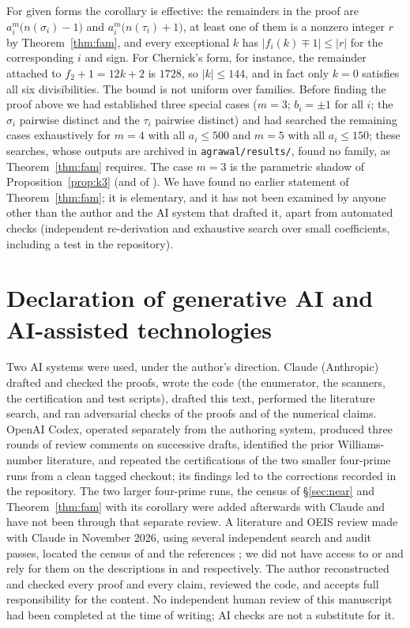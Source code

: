 \documentclass[11pt]{amsart}
\theoremstyle{definition}
\theoremstyle{remark}
\begin{document}
For given forms the corollary is effective: the remainders in the proof are $a_i^m\bigl(n(\sigma_i)-1\bigr)$ and $a_i^m\bigl(n(\tau_i)+1\bigr)$, at least one of them is a nonzero integer $r$ by Theorem~\ref{thm:fam}, and every exceptional $k$ has $|f_i(k)\mp1|\le|r|$ for the corresponding $i$ and sign. For Chernick's form, for instance, the remainder attached to $f_2+1=12k+2$ is $1728$, so $|k|\le144$, and in fact only $k=0$ satisfies all six divisibilities. The bound is not uniform over families. Before finding the proof above we had established three special cases ($m=3$; $b_i=\pm1$ for all $i$; the $\sigma_i$ pairwise distinct and the $\tau_i$ pairwise distinct) and had searched the remaining cases exhaustively for $m=4$ with all $a_i\le500$ and $m=5$ with all $a_i\le150$; these searches, whose outputs are archived in \texttt{agrawal/results/}, found no family, as Theorem~\ref{thm:fam} requires. The case $m=3$ is the parametric shadow of Proposition~\ref{prop:k3} (and of \cite[Thm.~13]{Ballot26}). We have found no earlier statement of Theorem~\ref{thm:fam}; it is elementary, and it has not been examined by anyone other than the author and the AI system that drafted it, apart from automated checks (independent re-derivation and exhaustive search over small coefficients, including a test in the repository).

\section*{Declaration of generative AI and AI-assisted technologies}
Two AI systems were used, under the author's direction. Claude (Anthropic) drafted and checked the proofs, wrote the code (the enumerator, the scanners, the certification and test scripts), drafted this text, performed the literature search, and ran adversarial checks of the proofs and of the numerical claims. OpenAI Codex, operated separately from the authoring system, produced three rounds of review comments on successive drafts, identified the prior Williams-number literature, and repeated the certifications of the two smaller four-prime runs from a clean tagged checkout; its findings led to the corrections recorded in the repository. The two larger four-prime runs, the census of \S\ref{sec:near} and Theorem~\ref{thm:fam} with its corollary were added afterwards with Claude and have not been through that separate review. A literature and OEIS review made with Claude in November 2026, using several independent search and audit passes, located the census of \cite{Pud28,Pud30} and the references \cite{Ballot26,Grau15,HW24,Leng17}; we did not have access to \cite{Echi07} or \cite{LMO90} and rely for them on the descriptions in \cite{Zhang15,MD15} and \cite{Pinch07} respectively. The author reconstructed and checked every proof and every claim, reviewed the code, and accepts full responsibility for the content. No independent human review of this manuscript had been completed at the time of writing; AI checks are not a substitute for it.
\end{document}
